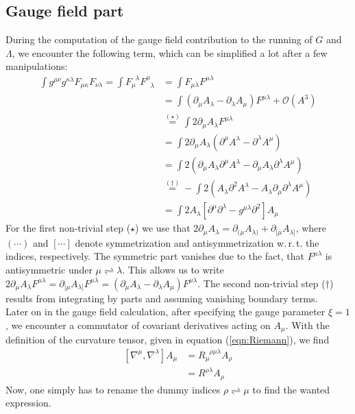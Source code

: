 \subsection*{Gauge field part}
During the computation of the gauge field contribution to the running of $G$ and $\Lambda$, we encounter the following term, which can be simplified a lot after a few manipulations:
\begin{align}\label{eqn:FF2} 
\int g^{\mu\nu}g^{\kappa\lambda} F_{\mu\kappa}F_{\nu\lambda} = \int F_{\mu}^{\phantom{\mu}\lambda}F_{\phantom{\mu}\lambda}^{\mu}	&= \int  F_{\mu\lambda}F^{\mu\lambda} \nonumber	\\
&= \int \left(\partial_{\mu}A_{\lambda} - \partial_{\lambda}A_{\mu}\right)F^{\mu\lambda} + \mathcal{O}\left(A^3\right)\nonumber \\
&\overset{(\star)}{=} \int 2\partial_{\mu}A_{\lambda} F^{\mu\lambda}\nonumber  \\
&=  \int 2\partial_{\mu}A_{\lambda}\left(\partial^{\mu}A^{\lambda} - \partial^{\lambda}A^{\mu}\right) \\
&= \int 2\left(\partial_{\mu}A_{\lambda}\partial^{\mu}A^{\lambda} - \partial_{\mu}A_{\lambda}\partial^{\lambda}A^{\mu}\right) \nonumber\\
&\overset{(\dagger)}{=} -\int 2\left( A_{\lambda}\partial^2A^{\lambda} - A_{\lambda}\partial_{\mu}\partial^{\lambda}A^{\mu}\right) \nonumber\\
&= \int 2A_{\lambda}\left[\partial^{\mu}\partial^{\lambda} - g^{\mu\lambda}\partial^2\right]A_{\mu}\nonumber 
\end{align}
For the first non-trivial step ($\star$) we use that $2\partial_{\mu}A_{\lambda} = \partial_{(\mu}A_{\lambda)} + \partial_{[\mu}A_{\lambda]}$, where $(\cdots)$ and $[\cdots]$ denote symmetrization and antisymmetrization w.\,r.\,t. the indices, respectively. The symmetric part vanishes due to the fact, that $F^{\mu\lambda}$ is antisymmetric under $\mu \rightleftharpoons \lambda$. This allows us to write $2\partial_{\mu}A_{\lambda}F^{\mu\lambda} = \partial_{[\mu}A_{\lambda]}F^{\mu\lambda} = \left(\partial_{\mu}A_{\lambda} - \partial_{\lambda}A_{\mu}\right)F^{\mu\lambda}$. The  second non-trivial step ($\dagger$) results from integrating by parts and assuming vanishing boundary terms. \\

Later on in the gauge field calculation, after specifying the gauge parameter $\xi=1$, we encounter a commutator of covariant derivatives acting on $A_{\mu}$. With the definition of the curvature tensor, given in equation (\ref{eqn:Riemann}), we find
\begin{equation}
\begin{aligned}
\left[\nabla^{\mu}, \nabla^{\lambda}\right]A_{\mu} &= R_{\mu}^{\phantom{\mu}\rho\mu\lambda}A_{\rho} \\
&= R^{\rho\lambda}A_{\rho} \label{eqn:RiemannB}
\end{aligned}	
\end{equation}
Now, one simply has to rename the dummy indices $\rho \rightleftharpoons \mu$ to find the wanted expression. 	
